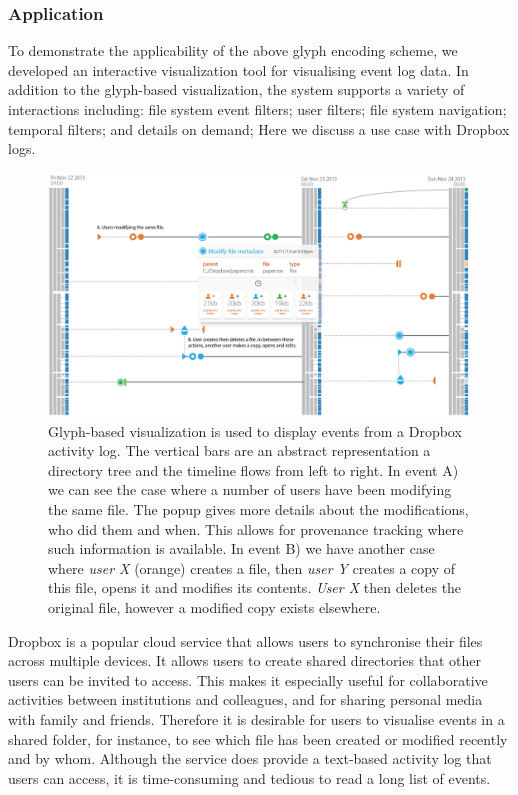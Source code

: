 \subsubsection{Application}
\label{sec:application}

To demonstrate the applicability of the above glyph encoding scheme, we developed an interactive visualization tool for visualising event log data.
In addition to the glyph-based visualization, the system supports a variety of interactions including: file system event filters; user filters; file system navigation; temporal filters; and details on demand;
Here we discuss a use case with Dropbox logs.

\begin{figure}[ht!]
\begin{center}
\includegraphics[width=\textwidth]{images/filesystem/dropbox-casestudy-2}
\end{center}
\caption{Glyph-based visualization is used to display events from a Dropbox activity log. The vertical bars are an abstract representation a directory tree and the timeline flows from left to right.
In event A) we can see the case where a number of users have been modifying the same file. The popup gives more details about the modifications, who did them and when. This allows for provenance tracking where such information is available.
In event B) we have another case where \emph{user X} (orange) creates a file, then \emph{user Y} creates a copy of this file, opens it and modifies its contents. \emph{User X} then deletes the original file, however a modified copy exists elsewhere.}
\label{fig:dropbox}
\end{figure}

%
Dropbox is a popular cloud service that allows users to synchronise their files across multiple devices.
It allows users to create shared directories that other users can be invited to access.
This makes it especially useful for collaborative activities between institutions and colleagues, and for sharing personal media with family and friends.
Therefore it is desirable for users to visualise events in a shared folder, for instance, to see which file has been created or modified recently and by whom.
Although the service does provide a text-based activity log that users can access, it is time-consuming and tedious to read a long list of events.


